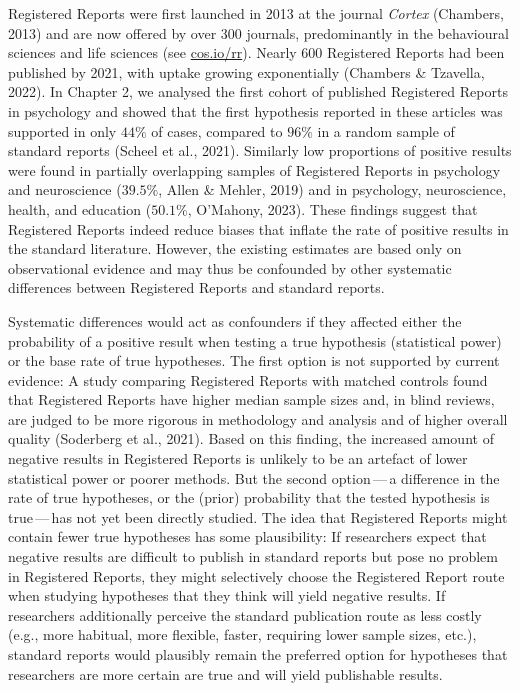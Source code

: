 \documentclass[
  ,man,mask,floatsintext]{apa6}
\begin{document}
Registered Reports were first launched in 2013 at the journal \emph{Cortex} (Chambers, 2013) and are now offered by over 300 journals, predominantly in the behavioural sciences and life sciences (see \url{cos.io/rr}).
Nearly 600 Registered Reports had been published by 2021, with uptake growing exponentially (Chambers \& Tzavella, 2022).
In Chapter 2, we analysed the first cohort of published Registered Reports in psychology and showed that the first hypothesis reported in these articles was supported in only \(44\%\) of cases, compared to \(96\%\) in a random sample of standard reports (Scheel et al., 2021).
Similarly low proportions of positive results were found in partially overlapping samples of Registered Reports in psychology and neuroscience (\(39.5\%\), Allen \& Mehler, 2019) and in psychology, neuroscience, health, and education (\(50.1\%\), O'Mahony, 2023).
These findings suggest that Registered Reports indeed reduce biases that inflate the rate of positive results in the standard literature.
However, the existing estimates are based only on observational evidence and may thus be confounded by other systematic differences between Registered Reports and standard reports.

Systematic differences would act as confounders if they affected either the probability of a positive result when testing a true hypothesis (statistical power) or the base rate of true hypotheses.
The first option is not supported by current evidence:
A study comparing Registered Reports with matched controls found that Registered Reports have higher median sample sizes and, in blind reviews, are judged to be more rigorous in methodology and analysis and of higher overall quality (Soderberg et al., 2021).
Based on this finding, the increased amount of negative results in Registered Reports is unlikely to be an artefact of lower statistical power or poorer methods.
But the second option\(\,\)---\(\,\)a difference in the rate of true hypotheses, or the (prior) probability that the tested hypothesis is true\(\,\)---\(\,\)has not yet been directly studied.
The idea that Registered Reports might contain fewer true hypotheses has some plausibility:
If researchers expect that negative results are difficult to publish in standard reports but pose no problem in Registered Reports, they might selectively choose the Registered Report route when studying hypotheses that they think
will yield negative results.
If researchers additionally perceive the standard publication route as less costly (e.g., more habitual, more flexible, faster, requiring lower sample sizes, etc.), standard reports would plausibly remain the preferred option for hypotheses that researchers are more certain are true and will yield publishable results.
\end{document}
